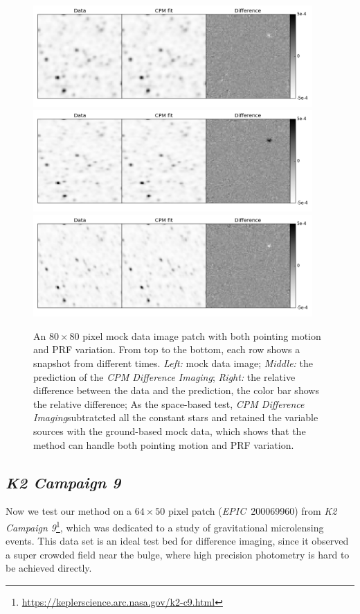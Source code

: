 \documentclass[12pt, preprint]{aastex}
\newcommand{\project}[1]{\textsl{#1}}
\newcommand{\cpmdiff}{\project{CPM Difference Imaging}}
\newcommand{\KTCN}{\project{K2 Campaign 9}}
\newcommand{\epic}{\project{EPIC}}
\begin{document}
\begin{figure}[p]
\begin{center}
\includegraphics[width=0.95\textwidth]{f2a}
\includegraphics[width=0.95\textwidth]{f2b}
\includegraphics[width=0.95\textwidth]{f2c}
\end{center}
\caption{
  \label{ground}
  An $80\times 80$ pixel mock data image patch with both pointing motion and PRF variation. From top to the bottom,  each row shows a snapshot from different times.
  \emph{Left:} mock data image;
  \emph{Middle:} the prediction of the \cpmdiff;
  \emph{Right:} the relative difference between the data and the prediction, the color bar shows the relative difference;
  As the space-based test, \cpmdiff subtratcted all the constant stars and retained the variable sources with the ground-based mock data, which shows that the method can handle both pointing motion and PRF variation. 
}
\end{figure}

\subsection{\KTCN}
Now we test our method on a $64\times50$ pixel patch (\epic\ 200069960) from \KTCN\footnote{\url{https://keplerscience.arc.nasa.gov/k2-c9.html}}, which was dedicated to a study of gravitational microlensing events.
This data set is an ideal test bed for difference imaging, since it observed a super crowded field near the bulge, where high precision photometry is hard to be achieved directly.
\end{document}

